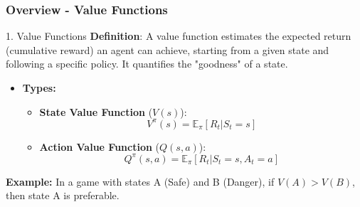 \documentclass{beamer}
\begin{document}
\begin{frame}[fragile]
    \frametitle{Overview - Value Functions}
    \begin{block}{1. Value Functions}
        \textbf{Definition}: A value function estimates the expected return (cumulative reward) an agent can achieve, starting from a given state and following a specific policy. It quantifies the "goodness" of a state.
    \end{block}
    
    \begin{itemize}
        \item \textbf{Types:}
        \begin{itemize}
            \item \textbf{State Value Function} ($V(s)$): 
            \[
            V^{\pi}(s) = \mathbb{E}_{\pi} \left[ R_t | S_t = s \right]
            \]
            \item \textbf{Action Value Function} ($Q(s, a)$): 
            \[
            Q^{\pi}(s, a) = \mathbb{E}_{\pi} \left[ R_t | S_t = s, A_t = a \right]
            \]
        \end{itemize}
    \end{itemize}
    
    \textbf{Example:} In a game with states A (Safe) and B (Danger), if $V(A) > V(B)$, then state A is preferable.
\end{frame}
\end{document}

